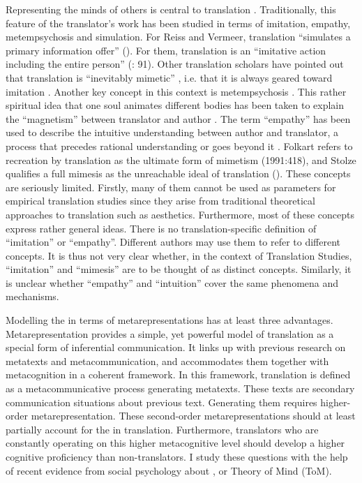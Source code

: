 \documentclass[output=paper]{LSP/langsci}
\begin{document}
Representing the minds of others is central to translation \citep{Wilss1992}. Traditionally, this feature of the translator's work has been studied in terms of imitation, empathy, metempsychosis and simulation. For Reiss and Vermeer, translation ``simulates a primary information offer'' (\citeyear[88]{Reiss1991}). For them, translation is an ``imitative action including the entire person'' (\citeyear{Reiss1991}: 91). Other translation scholars have pointed out that translation is ``inevitably mimetic'' \citep[249]{Mossop1998}, i.e. that it is always geared toward imitation \citep{Mossop1983, Mossop1998, Folkart1991, Gutt2000, Hermans2007}. Another key concept in this context is metempsychosis \citep[108]{Dussart1994}. This rather spiritual idea that one soul animates different bodies has been taken to explain the ``magnetism'' between translator and author \citep[241]{Wuilmart1990}. The term ``empathy'' has been used to describe the intuitive understanding between author and translator, a process that precedes rational understanding or goes beyond it \citep[109]{Dussart1994}. Folkart refers to recreation by translation as the ultimate form of mimetism (1991:418), and Stolze qualifies a full mimesis as the unreachable ideal of translation (\citeyear[144]{Stolze2010}). These concepts are seriously limited. Firstly, many of them cannot be used as parameters for empirical translation studies since they arise from traditional theoretical approaches to translation such as aesthetics. Furthermore, most of these concepts express rather general ideas. There is no translation-specific definition of ``imitation'' or ``empathy''. Different authors may use them to refer to different concepts. It is thus not very clear whether, in the context of Translation Studies, ``imitation'' and ``mimesis'' are to be thought of as distinct concepts. Similarly, it is unclear whether ``empathy'' and ``intuition'' cover the same phenomena and mechanisms.


Modelling the  in terms of metarepresentations has at least three advantages. Metarepresentation provides a simple, yet powerful model of translation as a special form of inferential communication. It links up with previous research on metatexts and metacommunication, and accommodates them together with metacognition in a coherent framework. In this framework, translation is defined as a metacommunicative process generating metatexts. These texts are secondary communication situations about previous text. Generating them requires higher-order metarepresentation. These second-order metarepresentations should at least partially account for the  in translation. Furthermore, translators who are constantly operating on this higher metacognitive level should develop a higher cognitive proficiency than non-translators. I study these questions with the help of recent evidence from social psychology about , or Theory of Mind (ToM). 
\end{document}
